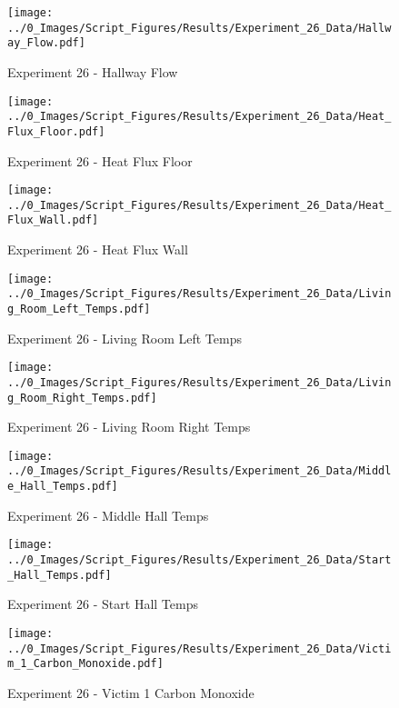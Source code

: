 	\begin{figure}[H]
		\centering
		\texttt{[image: ../0\_Images/Script\_Figures/Results/Experiment\_26\_Data/Hallway\_Flow.pdf]}
		\caption[]{Experiment 26 - Hallway Flow}
	\end{figure}
 
	\clearpage

	\begin{figure}[H]
		\centering
		\texttt{[image: ../0\_Images/Script\_Figures/Results/Experiment\_26\_Data/Heat\_Flux\_Floor.pdf]}
		\caption[]{Experiment 26 - Heat Flux Floor}
	\end{figure}
 

	\begin{figure}[H]
		\centering
		\texttt{[image: ../0\_Images/Script\_Figures/Results/Experiment\_26\_Data/Heat\_Flux\_Wall.pdf]}
		\caption[]{Experiment 26 - Heat Flux Wall}
	\end{figure}
 
	\clearpage

	\begin{figure}[H]
		\centering
		\texttt{[image: ../0\_Images/Script\_Figures/Results/Experiment\_26\_Data/Living\_Room\_Left\_Temps.pdf]}
		\caption[]{Experiment 26 - Living Room Left Temps}
	\end{figure}
 

	\begin{figure}[H]
		\centering
		\texttt{[image: ../0\_Images/Script\_Figures/Results/Experiment\_26\_Data/Living\_Room\_Right\_Temps.pdf]}
		\caption[]{Experiment 26 - Living Room Right Temps}
	\end{figure}
 
	\clearpage

	\begin{figure}[H]
		\centering
		\texttt{[image: ../0\_Images/Script\_Figures/Results/Experiment\_26\_Data/Middle\_Hall\_Temps.pdf]}
		\caption[]{Experiment 26 - Middle Hall Temps}
	\end{figure}
 

	\begin{figure}[H]
		\centering
		\texttt{[image: ../0\_Images/Script\_Figures/Results/Experiment\_26\_Data/Start\_Hall\_Temps.pdf]}
		\caption[]{Experiment 26 - Start Hall Temps}
	\end{figure}
 
	\clearpage

	\begin{figure}[H]
		\centering
		\texttt{[image: ../0\_Images/Script\_Figures/Results/Experiment\_26\_Data/Victim\_1\_Carbon\_Monoxide.pdf]}
		\caption[]{Experiment 26 - Victim 1 Carbon Monoxide}
	\end{figure}
 

